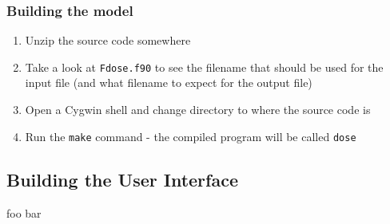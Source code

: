 \documentclass[10pt,a4paper]{article}
\newcommand{\bslash}{\symbol{92}}
\begin{document}
\subsubsection*{Building the model}

\begin{enumerate}

\item Unzip the source code somewhere

\item Take a look at \texttt{F{\bslash}dose.f90} to see the filename that should be used for the 
input file (and what filename to expect for the output file)

\item Open a Cygwin shell and change directory to where the source code is

\item Run the \texttt{make} command - the compiled program will be called \texttt{dose}

\end{enumerate}


\subsection{Building the User Interface}

foo bar
\end{document}
